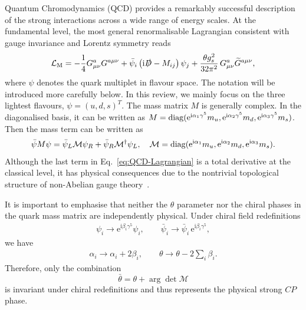 \documentclass[review]{elsarticle}
\numberwithin{equation}{section}
\numberwithin{table}{section}
\numberwithin{figure}{section}
\def\i{\mathrm{i}}
\def\e{\mathrm{e}}
\def\M{\mathcal{M}}
\begin{document}
Quantum Chromodynamics (QCD) provides a remarkably successful description of the strong interactions across a wide range of energy scales. At the fundamental level, the most general renormalisable Lagrangian consistent with gauge invariance and Lorentz symmetry reads
\begin{align}
    \mathcal{L}_{\rm M}
    =
    -\frac{1}{4}G^a_{\mu\nu}G^{a\mu\nu}
    +
    \bar{\psi}_i\left(\i\slashed{D}-M_{ij}\right)\psi_j
    +\frac{\theta g_s^2}{32\pi^2}\, G^a_{\mu\nu}\widetilde{G}^{a\mu\nu},
    \label{eq:QCD-Lagrangian}
\end{align}
where $\psi$ denotes the quark multiplet in flavour space. The notation will be introduced more carefully below. In this review, we mainly focus on the three lightest flavours, $\psi=(u,d,s)^T$. The mass matrix $M$ is generally complex. In the diagonalised basis, it can be written as $M={\rm diag}(\e^{\i\alpha_1\gamma^5} m_u, \e^{\i\alpha_2\gamma^5} m_d, \e^{\i\alpha_3\gamma^5}m_s)$. Then the mass term can be written as 
\begin{align}
    \bar\psi M\psi = \bar\psi_L\M \psi_R +\bar\psi_R\M^\dagger\psi_L,
    \quad 
    \M = {\rm diag}(\e^{\i\alpha_1}m_u, \e^{\i\alpha_2}m_d,\e^{\i\alpha_3}m_s).
    \label{eq:Dirac-mass}
\end{align}
Although the last term in Eq.~\eqref{eq:QCD-Lagrangian} is a total derivative at the classical level, it has physical consequences due to the nontrivial topological structure of non-Abelian gauge theory~\cite{Belavin:1975fg,tHooft:1976snw}.

It is important to emphasise that neither the $\theta$ parameter nor the chiral phases in the quark mass matrix are independently physical. Under chiral field redefinitions
\begin{align}
    \psi_i \rightarrow \mathrm{e}^{\i\beta_i\gamma^5}\psi_i,
    \qquad
    \bar{\psi}_i \rightarrow \bar{\psi}_i\,\mathrm{e}^{\i\beta_i\gamma^5},
    \label{eq:chiralrotations}
\end{align}
we have~\cite{Fujikawa:1979ay,Fujikawa:1980eg}
\begin{align}
    \alpha_i \rightarrow \alpha_i+2\beta_i,
    \qquad
    \theta \rightarrow \theta-2\sum_i\beta_i.
\end{align}
Therefore, only the combination
\begin{equation}
    \bar{\theta} = \theta + \arg\det \M
\end{equation}
is invariant under chiral redefinitions and thus represents the physical strong $CP$ phase.
\end{document}
